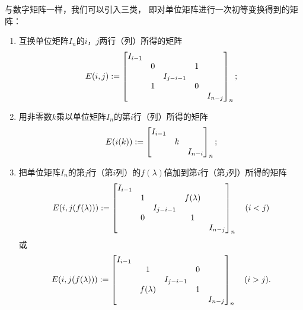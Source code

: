 与数字矩阵一样，我们可以引入三类，
即对单位矩阵进行一次初等变换得到的矩阵：\begin{enumerate}
	\item 互换单位矩阵\(I_n\)的\(i\)，\(j\)两行（列）所得的矩阵\begin{equation*}
		E(i,j)
		:=
		\begin{bmatrix}
			I_{i-1} & & & \\
			& 0 & & 1 & \\
			& & I_{j-i-1} & & \\
			& 1 & & 0 & \\
			& & & & I_{n-j}
		\end{bmatrix}_n;
	\end{equation*}

	\item 用非零数\(k\)乘以单位矩阵\(I_n\)的第\(i\)行（列）所得的矩阵\begin{equation*}
		E(i(k))
		:=
		\begin{bmatrix}
			I_{i-1} & & \\
			& k & \\
			& & I_{n-i}
		\end{bmatrix}_n;
	\end{equation*}

	\item 把单位矩阵\(I_n\)的第\(j\)行（第\(i\)列）的\(f(\lambda)\)倍加到第\(i\)行（第\(j\)列）所得的矩阵\begin{equation*}
		E(i,j(f(\lambda)))
		:=
		\begin{bmatrix}
			I_{i-1} & & & \\
			& 1 & & f(\lambda) & \\
			& & I_{j-i-1} & & \\
			& 0 & & 1 & \\
			& & & & I_{n-j}
		\end{bmatrix}_n
		\quad(i<j)
	\end{equation*}
	或\begin{equation*}
		E(i,j(f(\lambda)))
		:=
		\begin{bmatrix}
			I_{i-1} & & & \\
			& 1 & & 0 & \\
			& & I_{j-i-1} & & \\
			& f(\lambda) & & 1 & \\
			& & & & I_{n-j}
		\end{bmatrix}_n
		\quad(i>j).
	\end{equation*}
\end{enumerate}
